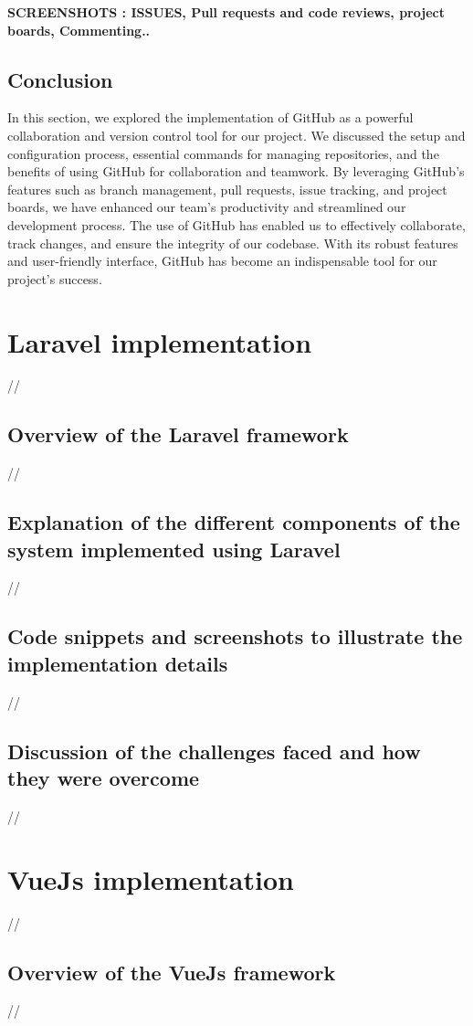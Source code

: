 \medskip \textbf{SCREENSHOTS : ISSUES, Pull requests and code reviews, project boards, Commenting..}
\subsection{Conclusion}
In this section, we explored the implementation of GitHub as a powerful collaboration and version control tool for our project. We discussed the setup and configuration process, essential commands for managing repositories, and the benefits of using GitHub for collaboration and teamwork. By leveraging GitHub's features such as branch management, pull requests, issue tracking, and project boards, we have enhanced our team's productivity and streamlined our development process. The use of GitHub has enabled us to effectively collaborate, track changes, and ensure the integrity of our codebase. With its robust features and user-friendly interface, GitHub has become an indispensable tool for our project's success.
\section {Laravel implementation}
//
\subsection {Overview of the Laravel framework}
//
\subsection {Explanation of the different components of the system implemented using Laravel}
//
\subsection {Code snippets and screenshots to illustrate the implementation details}
//
\subsection {Discussion of the challenges faced and how they were overcome}

//

\section {VueJs implementation}
//
\subsection {Overview of the VueJs framework}
//

